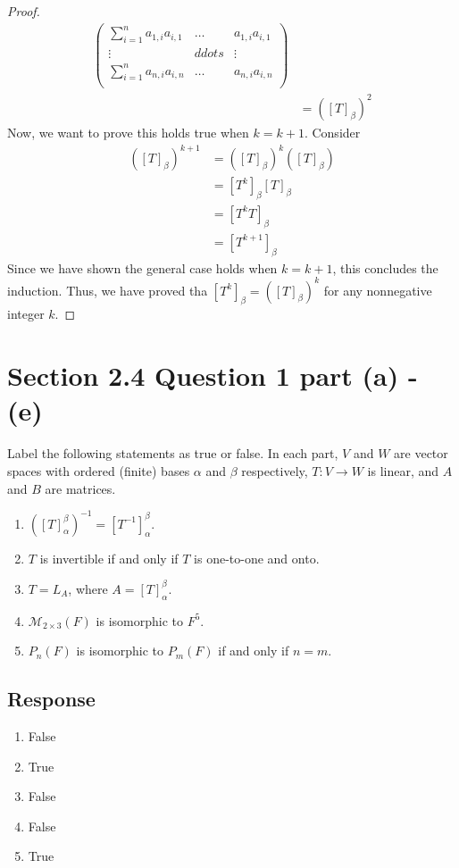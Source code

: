 \documentclass[13pt]{article}
\begin{document}
\begin{proof}
\begin{align*}
\begin{pmatrix}
                    \sum_{i = 1}^n a_{1, i}a_{i, 1} & \ldots &  a_{1, i}a_{i, 1} \\
                    \vdots & ddots & \vdots \\
                    \sum_{i = 1}^n a_{n, i}a_{i, n} & \ldots &  a_{n, i}a_{i, n} \\
                  \end{pmatrix} \\
                &= ([T]_\beta)^2
  \end{align*}
  Now, we want to prove this holds true when $k = k + 1$. Consider
  \begin{align*}
    ([T]_\beta)^{k + 1} &= ([T]_\beta)^k ([T]_\beta) \\
                        &= [T^k]_\beta [T]_\beta \\
                        &= [T^kT]_\beta \\
                        &= [T^{k + 1}]_\beta
  \end{align*}
  Since we have shown the general case holds when $k = k + 1$, this concludes the induction. Thus, we have proved tha $[T^k]_\beta = ([T]_\beta)^k$ for any nonnegative integer $k$.
\end{proof}

\newpage
\section*{Section 2.4 Question 1 part (a) - (e)}
Label the following statements as true or false. In each part, $V$ and $W$ are vector spaces with ordered (finite) bases $\alpha$ and $\beta$ respectively, $T : V \rightarrow W$ is linear, and $A$ and $B$ are matrices.
\begin{enumerate}[label=(\alph*),leftmargin=*]
\item $([T]_\alpha^\beta)^{-1} = [T^{-1}]_\alpha^\beta$.
\item $T$ is invertible if and only if $T$ is one-to-one and onto.
\item $T = L_A$, where $A = [T]_\alpha^\beta$.
\item $\mathcal{M}_{2 \times 3}(F)$ is isomorphic to $F^5$.
\item $P_n(F)$ is isomorphic to $P_m(F)$ if and only if $n = m$.
\end{enumerate}
\subsection*{Response}
\begin{enumerate}[label=(\alph*),leftmargin=*]
\item False
\item True
\item False
\item False
\item True
\end{enumerate}
\end{document}
